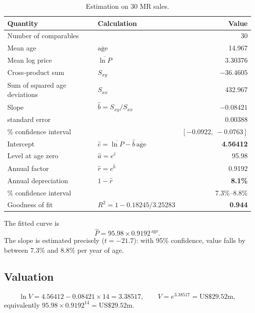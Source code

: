 \documentclass[11pt,a4paper]{article}
\newcommand{\usd}[1]{\text{US\$}#1}
\newcommand{\age}{\mathrm{age}}
\begin{document}
\begin{table}[h]
\centering
\caption{Estimation on 30 MR sales.}
\label{tab:est}
\begin{tabular}{@{}l l r@{}}
\toprule
Quantity & Calculation & Value \\
\midrule
Number of comparables & & 30 \\
Mean age & $\overline{\age}$ & 14.967 \\
Mean log price & $\overline{\ln P}$ & 3.30376 \\
Cross-product sum & $S_{xy}$ & $-36.4605$ \\
Sum of squared age deviations & $S_{xx}$ & 432.967 \\
\midrule
Slope & $\hat b = S_{xy}/S_{xx}$ & $\mathbf{-0.08421}$ \\
\quad standard error & & 0.00388 \\
\quad 95\% confidence interval & & $[-0.0922,\ -0.0763]$ \\
Intercept & $\hat c = \overline{\ln P} - \hat b\,\overline{\age}$ & \textbf{4.56412} \\
Level at age zero & $\hat a = e^{\hat c}$ & 95.98 \\
Annual factor & $\hat r = e^{\hat b}$ & 0.9192 \\
Annual depreciation & $1 - \hat r$ & \textbf{8.1\%} \\
\quad 95\% confidence interval & & 7.3\%--8.8\% \\
Goodness of fit & $R^2 = 1 - 0.18245/3.25283$ & \textbf{0.944} \\
\bottomrule
\end{tabular}
\end{table}

The fitted curve is
\[
\hat P = 95.98 \times 0.9192^{\,\age}.
\]
The slope is estimated precisely ($t = -21.7$): with 95\% confidence, value falls by between 7.3\% and 8.8\% per year of age.

\subsection{Valuation}

\[
\ln V = 4.56412 - 0.08421 \times 14 = 3.38517, \qquad V = e^{3.38517} = \usd{29.52}\text{m},
\]
equivalently $95.98 \times 0.9192^{14} = \usd{29.52}$m.
\end{document}
